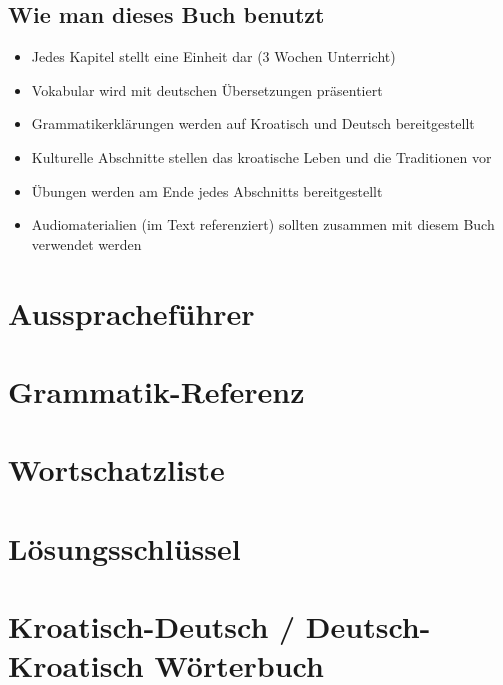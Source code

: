 \documentclass[11pt,a4paper,twoside]{book}
\begin{document}
\section*{Wie man dieses Buch benutzt}
\begin{itemize}
    \item Jedes Kapitel stellt eine Einheit dar (3 Wochen Unterricht)
    \item Vokabular wird mit deutschen Übersetzungen präsentiert
    \item Grammatikerklärungen werden auf Kroatisch und Deutsch bereitgestellt
    \item Kulturelle Abschnitte stellen das kroatische Leben und die Traditionen vor
    \item Übungen werden am Ende jedes Abschnitts bereitgestellt
    \item Audiomaterialien (im Text referenziert) sollten zusammen mit diesem Buch verwendet werden
\end{itemize}

\clearpage














\appendix
\chapter{Ausspracheführer}


\chapter{Grammatik-Referenz}


\chapter{Wortschatzliste}


\chapter{Lösungsschlüssel}


\chapter{Kroatisch-Deutsch / Deutsch-Kroatisch Wörterbuch}

\end{document}
